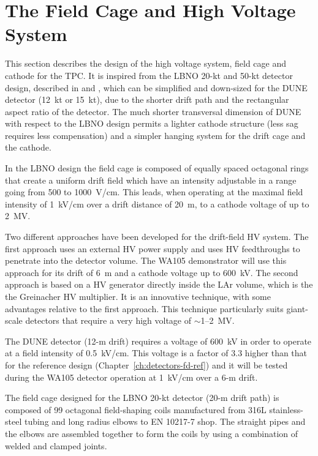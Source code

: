 \section{The Field Cage and High Voltage System} 
\label{sec:detectors-fd-alt-hv}

This section describes the design of the high voltage system, field
cage and cathode for the TPC.  It is inspired from the LBNO 20-kt and
50-kt detector design, described in \anxlbnoa and \anxlbnob, which can
be simplified and down-sized for the DUNE detector (12~kt or 15~kt),
due to the shorter drift path and the rectangular aspect ratio of the
detector. The much shorter transversal dimension of DUNE with respect
to the LBNO design permits a lighter cathode structure (less sag
requires less compensation) and a simpler hanging system for the drift
cage and the cathode.

In the LBNO design the field cage is composed of equally spaced
octagonal rings that create a uniform drift field which have an
intensity adjustable in a range going from 500 to 1000~V/cm. This
leads, when operating at the maximal field intensity of 1~kV/cm over a
drift distance of 20~m, to a cathode voltage of up to 2~MV.

Two different approaches have been developed for the drift-field HV
system. The first approach uses an external HV power supply and uses
HV feedthroughs to penetrate into the detector volume. The WA105
demonstrator will use this approach for its drift of 6~m and a cathode
voltage up to 600~kV.  The second approach is based on a HV generator
directly inside the LAr volume, which is the the Greinacher HV
multiplier. It is an innovative technique, with some advantages
relative to the first approach. This technique particularly suits
giant-scale detectors that require a very high voltage of
$\sim$1--2~MV.

The DUNE detector (12-m drift) requires a voltage of 600~kV in order
to operate at a field intensity of 0.5~kV/cm. This voltage is a factor
of 3.3 higher than that for the reference design
(Chapter~\ref{ch:detectors-fd-ref}) and it will be tested during the
WA105 detector operation at 1~kV/cm over a 6-m drift.

The field cage designed for the LBNO 20-kt detector (20-m drift path)
is composed of 99 octagonal field-shaping coils manufactured from 316L
stainless-steel tubing and long radius elbows to EN 10217-7 shop. The
straight pipes and the elbows are assembled together to form the coils
by using a combination of welded and clamped joints.

